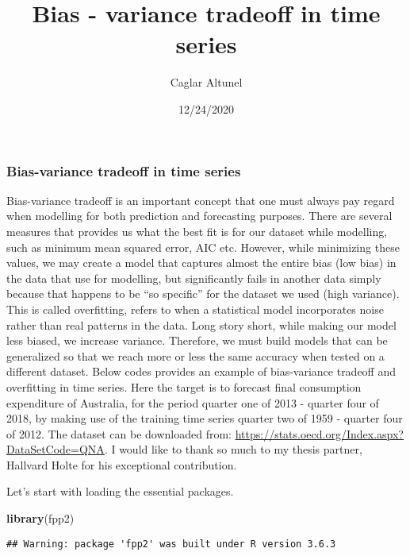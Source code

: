 \documentclass[
]{article}
\title{Bias - variance tradeoff in time series}
\author{Caglar Altunel}
\date{12/24/2020}
\newenvironment{Shaded}{\begin{snugshade}}{\end{snugshade}}
\newcommand{\KeywordTok}[1]{\textcolor[rgb]{0.13,0.29,0.53}{\textbf{#1}}}
\newcommand{\NormalTok}[1]{#1}
\begin{document}
\maketitle

\hypertarget{bias-variance-tradeoff-in-time-series}{%
\subsubsection{Bias-variance tradeoff in time
series}\label{bias-variance-tradeoff-in-time-series}}

Bias-variance tradeoff is an important concept that one must always pay
regard when modelling for both prediction and forecasting purposes.
There are several measures that provides us what the best fit is for our
dataset while modelling, such as minimum mean squared error, AIC etc.
However, while minimizing these values, we may create a model that
captures almost the entire bias (low bias) in the data that use for
modelling, but significantly fails in another data simply because that
happens to be ``so specific'' for the dataset we used (high variance).
This is called overfitting, refers to when a statistical model
incorporates noise rather than real patterns in the data. Long story
short, while making our model less biased, we increase variance.
Therefore, we must build models that can be generalized so that we reach
more or less the same accuracy when tested on a different dataset. Below
codes provides an example of bias-variance tradeoff and overfitting in
time series. Here the target is to forecast final consumption
expenditure of Australia, for the period quarter one of 2013 - quarter
four of 2018, by making use of the training time series quarter two of
1959 - quarter four of 2012. The dataset can be downloaded from:
\url{https://stats.oecd.org/Index.aspx?DataSetCode=QNA}. I would like to
thank so much to my thesis partner, Hallvard Holte for his exceptional
contribution.

Let's start with loading the essential packages.

\begin{Shaded}
\begin{Highlighting}[]
\KeywordTok{library}\NormalTok{(fpp2)}
\end{Highlighting}
\end{Shaded}

\begin{verbatim}
## Warning: package 'fpp2' was built under R version 3.6.3
\end{verbatim}
\end{document}
